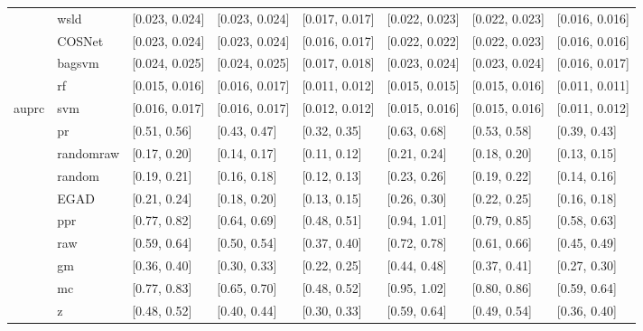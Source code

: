 \begin{table}[H]
{\begin{tabular}{llllllll}
 & wsld & [0.023, 0.024] & [0.023, 0.024] & [0.017, 0.017] & [0.022, 0.023] & [0.022, 0.023] & [0.016, 0.016]\\

 & COSNet & [0.023, 0.024] & [0.023, 0.024] & [0.016, 0.017] & [0.022, 0.022] & [0.022, 0.023] & [0.016, 0.016]\\

 & bagsvm & [0.024, 0.025] & [0.024, 0.025] & [0.017, 0.018] & [0.023, 0.024] & [0.023, 0.024] & [0.016, 0.017]\\

 & rf & [0.015, 0.016] & [0.016, 0.017] & [0.011, 0.012] & [0.015, 0.015] & [0.015, 0.016] & [0.011, 0.011]\\

\multirow{-15}{*}{\raggedright\arraybackslash auprc} & svm & [0.016, 0.017] & [0.016, 0.017] & [0.012, 0.012] & [0.015, 0.016] & [0.015, 0.016] & [0.011, 0.012]\\
\cmidrule{1-8}
 & pr & [0.51, 0.56] & [0.43, 0.47] & [0.32, 0.35] & [0.63, 0.68] & [0.53, 0.58] & [0.39, 0.43]\\

 & randomraw & [0.17, 0.20] & [0.14, 0.17] & [0.11, 0.12] & [0.21, 0.24] & [0.18, 0.20] & [0.13, 0.15]\\

 & random & [0.19, 0.21] & [0.16, 0.18] & [0.12, 0.13] & [0.23, 0.26] & [0.19, 0.22] & [0.14, 0.16]\\

 & EGAD & [0.21, 0.24] & [0.18, 0.20] & [0.13, 0.15] & [0.26, 0.30] & [0.22, 0.25] & [0.16, 0.18]\\

 & ppr & [0.77, 0.82] & [0.64, 0.69] & [0.48, 0.51] & [0.94, 1.01] & [0.79, 0.85] & [0.58, 0.63]\\

 & raw & [0.59, 0.64] & [0.50, 0.54] & [0.37, 0.40] & [0.72, 0.78] & [0.61, 0.66] & [0.45, 0.49]\\

 & gm & [0.36, 0.40] & [0.30, 0.33] & [0.22, 0.25] & [0.44, 0.48] & [0.37, 0.41] & [0.27, 0.30]\\

 & mc & [0.77, 0.83] & [0.65, 0.70] & [0.48, 0.52] & [0.95, 1.02] & [0.80, 0.86] & [0.59, 0.64]\\

 & z & [0.48, 0.52] & [0.40, 0.44] & [0.30, 0.33] & [0.59, 0.64] & [0.49, 0.54] & [0.36, 0.40]\\


\end{tabular}}
\end{table}
